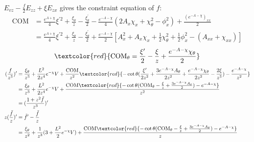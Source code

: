 \documentclass[12pt,a4paper]{ctexart}
\numberwithin{equation}{section}
\begin{document}
$E_{vz}-\frac{f}{2}E_{zz}+\xi E_{zx}$ gives the constraint equation of $f$:
\begin{equation}
    \begin{aligned}
        \mathrm{COM}&=\frac{e^{A+\chi}}{4}\xi^{\prime2}+\frac{\xi_{\theta}}{z}-\frac{\xi_{\theta}^{\prime}}{2}-\frac{e^{-A-\chi}}{4}(2A_x\chi_x+\chi_{\theta}^2-\phi_x^2)+\frac{(e^{-A-\chi})_{xx}}{2}\\
        &=\frac{e^{A+\chi}}{4}\xi^{\prime2}+\frac{\xi_{\theta}}{z}-\frac{\xi_{\theta}^{\prime}}{2}+\frac{e^{-A-\chi}}{2}[A_x^2+A_x\chi_x+\frac{1}{2}\chi_{\theta}^2+\frac{1}{2}\phi_x^2-(A_{xx}+\chi_{xx})]
    \end{aligned}
\end{equation}
\begin{equation}
    \textcolor{red}{\mathrm{COM}_\theta=\frac{\xi'}{2}-\frac{\xi}{z}+\frac{e^{-A-\chi}\chi_\theta}{2}}
\end{equation}
\begin{equation}
    \begin{aligned}
        (\frac{f}{z^{3}})^{\prime}&=\frac{\xi_{\theta}}{z^{3}}+\frac{L^{2}}{2z^{4}}e^{-\chi}V+\frac{\mathrm{COM}}{z^{2}}\textcolor{red}{-\cot\theta(\frac{\xi'}{2z^2}+\frac{3e^{-A-\chi}A_\theta}{2z^2}+\frac{e^{-A-\chi}\chi_\theta}{2z^2}-\frac{2\xi}{z^3})-\frac{e^{-A-\chi}}{z^2}}\\
        &=\frac{\xi_{\theta}}{z^{3}}+\frac{L^{2}}{2z^{4}}e^{-\chi}V+\frac{\mathrm{COM}\textcolor{red}{-\cot\theta(\mathrm{COM}_\theta-\frac{\xi}{z}+\frac{3e^{-A-\chi}A_\theta}{2})-e^{-A-\chi}}}{z^{2}}\\
        &=(\frac{1+z^2\tilde{f}}{z^{3}})^{\prime}\\
        z(\frac{\tilde{f}}{z})^{\prime}&=\tilde{f}'-\frac{\tilde
        {f}}{z}\\
        &=\frac{\xi_{\theta}}{z^2}+\frac{1}{z^3}(3+\frac{L^{2}}{2}e^{-\chi}V)+\frac{\mathrm{COM}\textcolor{red}{-\cot\theta(\mathrm{COM}_\theta-\frac{\xi}{z}+\frac{3e^{-A-\chi}A_\theta}{2})-e^{-A-\chi}}}{z}
    \end{aligned}
\end{equation}
\end{document}
